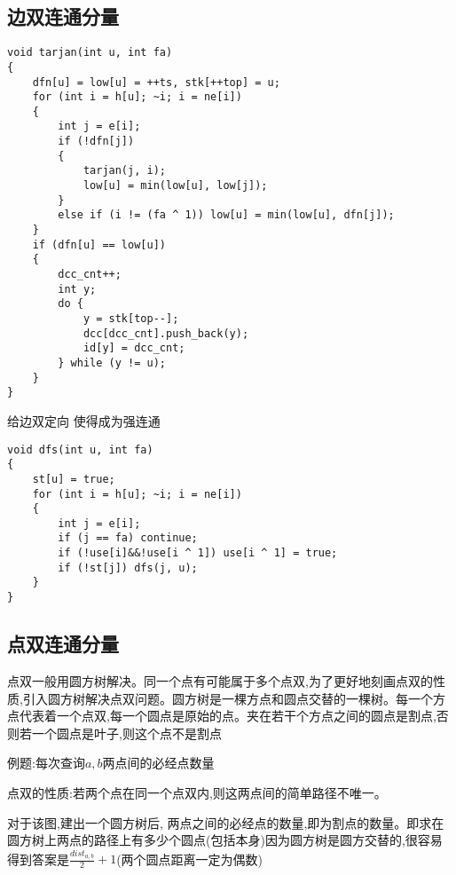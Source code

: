 \documentclass[a4paper, fontset=none]{ctexart}
\begin{document}
\subsection{边双连通分量}

\begin{verbatim}
void tarjan(int u, int fa)
{
    dfn[u] = low[u] = ++ts, stk[++top] = u;
    for (int i = h[u]; ~i; i = ne[i])
    {
        int j = e[i];
        if (!dfn[j])
        {
            tarjan(j, i);
            low[u] = min(low[u], low[j]);
        }
        else if (i != (fa ^ 1)) low[u] = min(low[u], dfn[j]);
    }
    if (dfn[u] == low[u])
    {
        dcc_cnt++;
        int y;
        do {
            y = stk[top--];
            dcc[dcc_cnt].push_back(y);
            id[y] = dcc_cnt;
        } while (y != u);
    }
}
\end{verbatim}

给边双定向 使得成为强连通

\begin{verbatim}
void dfs(int u, int fa)
{
    st[u] = true;
    for (int i = h[u]; ~i; i = ne[i])
    {
        int j = e[i];
        if (j == fa) continue;
        if (!use[i]&&!use[i ^ 1]) use[i ^ 1] = true;
        if (!st[j]) dfs(j, u);
    }
}
\end{verbatim}
\subsection{点双连通分量}
点双一般用圆方树解决。同一个点有可能属于多个点双,为了更好地刻画点双的性质,引入圆方树解决点双问题。圆方树是一棵方点和圆点交替的一棵树。每一个方点代表着一个点双,每一个圆点是原始的点。夹在若干个方点之间的圆点是割点,否则若一个圆点是叶子,则这个点不是割点

例题:每次查询$a, b$两点间的必经点数量

点双的性质:若两个点在同一个点双内,则这两点间的简单路径不唯一。

对于该图,建出一个圆方树后, 两点之间的必经点的数量,即为割点的数量。即求在圆方树上两点的路径上有多少个圆点(包括本身)因为圆方树是圆方交替的,很容易得到答案是$\frac{dist_{a, b}}{2}+1$(两个圆点距离一定为偶数)
\end{document}
